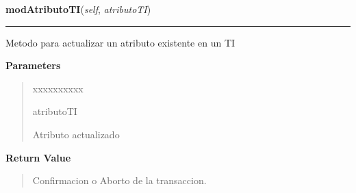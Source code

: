 \hspace{.8\funcindent}\begin{boxedminipage}{\funcwidth}

    \raggedright \textbf{modAtributoTI}(\textit{self}, \textit{atributoTI})

    \vspace{-1.5ex}

    \rule{\textwidth}{0.5\fboxrule}
\setlength{\parskip}{2ex}
    Metodo para actualizar un atributo existente en un TI

\setlength{\parskip}{1ex}
      \textbf{Parameters}
      \vspace{-1ex}

      \begin{quote}
        \begin{Ventry}{xxxxxxxxxx}

          \item[atributoTI]

          Atributo actualizado

        \end{Ventry}

      \end{quote}

      \textbf{Return Value}
    \vspace{-1ex}

      \begin{quote}
      Confirmacion o Aborto de la transaccion.

      \end{quote}

    \end{boxedminipage}

    \label{app:controlador:contArchivo:ControllerAtributoTI:delAtributoTI}

    \vspace{0.5ex}


